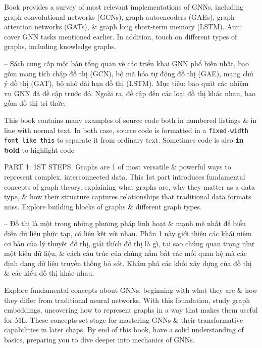 \documentclass{article}
\begin{document}
\begin{itemize}
\begin{itemize}
        Book provides a survey of most relevant implementations of GNNs, including graph convolutional networks (GCNs), graph autoencoders (GAEs), graph attention networks (GATs), \& graph long short-term memory (LSTM). Aim: cover GNN tasks mentioned earlier. In addition, touch on different types of graphs, including knowledge graphs.

        -- Sách cung cấp một bản tổng quan về các triển khai GNN phổ biến nhất, bao gồm mạng tích chập đồ thị (GCN), bộ mã hóa tự động đồ thị (GAE), mạng chú ý đồ thị (GAT), bộ nhớ dài hạn đồ thị (LSTM). Mục tiêu: bao quát các nhiệm vụ GNN đã đề cập trước đó. Ngoài ra, đề cập đến các loại đồ thị khác nhau, bao gồm đồ thị tri thức.

        This book contains many examples of source code both in numbered listings \& in line with normal text. In both case, source code is formatted in a {\tt fixed-width font like this} to separate it from ordinary text. Sometimes code is also \textbf{\texttt in bold} to highlight code
    \end{itemize}
    PART 1: 1ST STEPS. Graphs are 1 of most versatile \& powerful ways to represent complex, interconnected data. This 1st part introduces fundamental concepts of graph theory, explaining what graphs are, why they matter as a data type, \& how their structure captures relationships that traditional data formats miss. Explore building blocks of graphs \& different graph types.

    -- Đồ thị là một trong những phương pháp linh hoạt \& mạnh mẽ nhất để biểu diễn dữ liệu phức tạp, có liên kết với nhau. Phần 1 này giới thiệu các khái niệm cơ bản của lý thuyết đồ thị, giải thích đồ thị là gì, tại sao chúng quan trọng như một kiểu dữ liệu, \& cách cấu trúc của chúng nắm bắt các mối quan hệ mà các định dạng dữ liệu truyền thống bỏ sót. Khám phá các khối xây dựng của đồ thị \& các kiểu đồ thị khác nhau.

    Explore fundamental concepts about GNNs, beginning with what they are \& how they differ from traditional neural networks. With this foundation, study graph embeddings, uncovering how to represent graphs in a way that makes them useful for ML. These concepts set stage for mastering GNNs \& their transformative capabilities in later chaps. By end of this book, have a solid understanding of basics, preparing you to dive deeper into mechanics of GNNs.


\end{itemize}
\end{document}
